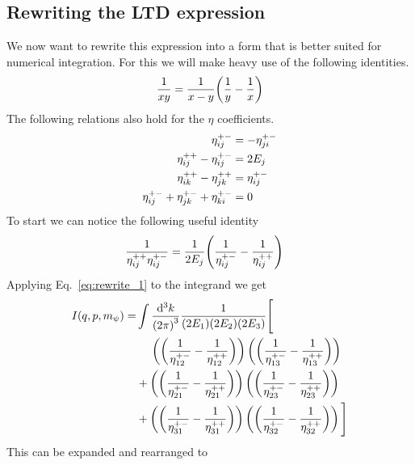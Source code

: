 \subsection{Rewriting the LTD expression}
We now want to rewrite this expression into a form that is better suited for numerical integration.
For this we will make heavy use of the following identities.
\begin{equation}
    \frac{1}{xy} = \frac{1}{x-y}\qty(\frac{1}{y}-\frac{1}{x})
\end{equation}
The following relations also hold for the $\eta$ coefficients.
\begin{align}
    \eta_{ij}^{+-} &= -\eta_{ji}^{+-}               \label{eq:hyper_antisym}\\
    \eta_{ij}^{++}-\eta_{ij}^{+-} &= 2E_j           \label{eq:elipt_min_hyper}\\
    \eta_{ik}^{++}-\eta_{jk}^{++} &= \eta_{ij}^{+-}   \label{eq:elipt_min_elipt}\\
    \eta_{ij}^{+-}+\eta_{jk}^{+-}+\eta_{ki}^{+-} &= 0 \label{eq:hyper_cycle}
\end{align}
To start we can notice the following useful identity
\begin{align}
    \frac{1}{\eta_{ij}^{++}\eta_{ij}^{+-}} &= \frac{1}{2E_j}\qty(\frac{1}{\eta_{ij}^{+-}} - \frac{1}{\eta_{ij}^{++}}) \label{eq:rewrite_1}
\end{align}
Applying Eq.~\eqref{eq:rewrite_1} to the integrand we get
\newcommand{\HMFRAC}[2]{\left(\frac{1}{\HYPER{#1}{#2}}-\frac{1}{\ELIPT{#1}{#2}}\right)}
\begin{align*}
I(q,p,m_\psi) =&  \int \frac{\dd[3]{k}}{{(2\pi)}^3} \frac{1}{(2E_1)(2E_2)(2E_3)} \Bigg[\\
      &  \phantom{{}+{}}
          \left(\HMFRAC{1}{2}\right)\left(\HMFRAC{1}{3}\right)\\
      &  +\left(\HMFRAC{2}{1}\right)\left(\HMFRAC{2}{3}\right)\\
      &  +\left(\HMFRAC{3}{1}\right)\left(\HMFRAC{3}{2}\right)
      \Bigg]
\end{align*}
This can be expanded and rearranged to
